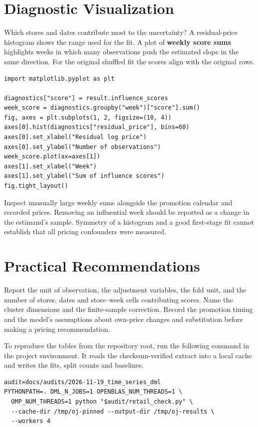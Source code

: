 \section{Diagnostic Visualization}\label{sec:ch04_visualization}

Which stores and dates contribute most to the uncertainty? A residual-price histogram shows the range used for the fit. A plot of \textbf{weekly score sums} highlights weeks in which many observations push the estimated slope in the same direction. For the original shuffled fit the scores align with the original rows.

\begin{verbatim}
import matplotlib.pyplot as plt

diagnostics["score"] = result.influence_scores
week_score = diagnostics.groupby("week")["score"].sum()
fig, axes = plt.subplots(1, 2, figsize=(10, 4))
axes[0].hist(diagnostics["residual_price"], bins=60)
axes[0].set_xlabel("Residual log price")
axes[0].set_ylabel("Number of observations")
week_score.plot(ax=axes[1])
axes[1].set_xlabel("Week")
axes[1].set_ylabel("Sum of influence scores")
fig.tight_layout()
\end{verbatim}

Inspect unusually large weekly sums alongside the promotion calendar and recorded prices. Removing an influential week should be reported as a change in the estimand's sample. Symmetry of a histogram and a good first-stage fit cannot establish that all pricing confounders were measured.

\section{Practical Recommendations}\label{sec:ch04_recommendations}

Report the unit of observation, the adjustment variables, the fold unit, and the number of stores, dates and store--week cells contributing scores. Name the cluster dimensions and the finite-sample correction. Record the promotion timing and the model's assumptions about own-price changes and substitution before making a pricing recommendation.

To reproduce the tables from the repository root, run the following command in the project environment. It reads the checksum-verified extract into a local cache and writes the fits, split counts and baselines.

\begin{verbatim}
audit=docs/audits/2026-11-19_time_series_dml
PYTHONPATH=. DML_N_JOBS=1 OPENBLAS_NUM_THREADS=1 \
  OMP_NUM_THREADS=1 python "$audit/retail_check.py" \
  --cache-dir /tmp/oj-pinned --output-dir /tmp/oj-results \
  --workers 4
\end{verbatim}

